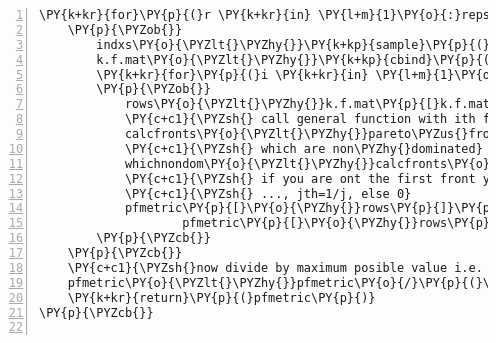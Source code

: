 \begin{Verbatim}[commandchars=\\\{\},codes={\catcode`\$=3\catcode`\^=7\catcode`\_=8},gobble=0,numbers=left,fontfamily=fvm,fontshape=n,fontsize=\footnotesize,tabsize=2]
	\PY{k+kr}{for}\PY{p}{(}r \PY{k+kr}{in} \PY{l+m}{1}\PY{o}{:}reps\PY{p}{)}
	\PY{p}{\PYZob{}}
		indxs\PY{o}{\PYZlt{}\PYZhy{}}\PY{k+kp}{sample}\PY{p}{(}\PY{l+m}{1}\PY{o}{:}n\PY{p}{)} \PY{c+c1}{\PYZsh{}fresh randomisation each repetition}
		k.f.mat\PY{o}{\PYZlt{}\PYZhy{}}\PY{k+kp}{cbind}\PY{p}{(}indxs\PY{p}{,}block.nos\PY{p}{)} \PY{c+c1}{\PYZsh{} create the fold \PYZsq{}blocks\PYZsq{} of data}
		\PY{k+kr}{for}\PY{p}{(}i \PY{k+kr}{in} \PY{l+m}{1}\PY{o}{:}nfolds\PY{p}{)}
		\PY{p}{\PYZob{}}
			rows\PY{o}{\PYZlt{}\PYZhy{}}k.f.mat\PY{p}{[}k.f.mat\PY{p}{[}\PY{p}{,}\PY{l+m}{2}\PY{p}{]}\PY{o}{==}i\PY{p}{,}\PY{l+m}{1}\PY{p}{]} \PY{c+c1}{\PYZsh{} find the ith fold to leave out}
			\PY{c+c1}{\PYZsh{} call general function with ith fold removed}
			calcfronts\PY{o}{\PYZlt{}\PYZhy{}}pareto\PYZus{}fronts\PY{p}{(}noFronts\PY{p}{,}objmatrix\PY{p}{[}\PY{o}{\PYZhy{}}rows\PY{p}{,}\PY{p}{]}\PY{p}{,}\PY{k+kp}{rep}\PY{p}{(}\PY{k+kc}{FALSE}\PY{p}{,}m\PY{p}{)}\PY{p}{)}
			\PY{c+c1}{\PYZsh{} which are non\PYZhy{}dominated}
			whichnondom\PY{o}{\PYZlt{}\PYZhy{}}calcfronts\PY{o}{\PYZgt{}}\PY{l+m}{0}
			\PY{c+c1}{\PYZsh{} if you are ont the first front you get 1, second=1/2, third=1/3,}
			\PY{c+c1}{\PYZsh{} ..., jth=1/j, else 0}
			pfmetric\PY{p}{[}\PY{o}{\PYZhy{}}rows\PY{p}{]}\PY{p}{[}whichnondom\PY{p}{]}\PY{o}{\PYZlt{}\PYZhy{}}
					pfmetric\PY{p}{[}\PY{o}{\PYZhy{}}rows\PY{p}{]}\PY{p}{[}whichnondom\PY{p}{]}\PY{l+m}{+1}\PY{o}{/}calcfronts\PY{p}{[}whichnondom\PY{p}{]}
		\PY{p}{\PYZcb{}}
	\PY{p}{\PYZcb{}}
	\PY{c+c1}{\PYZsh{}now divide by maximum posible value i.e. (nfolds\PYZhy{}1)*reps so output in [0,1]}
	pfmetric\PY{o}{\PYZlt{}\PYZhy{}}pfmetric\PY{o}{/}\PY{p}{(}\PY{p}{(}nfolds\PY{l+m}{\PYZhy{}1}\PY{p}{)}\PY{o}{*}reps\PY{p}{)} 
	\PY{k+kr}{return}\PY{p}{(}pfmetric\PY{p}{)}
\PY{p}{\PYZcb{}}


\end{Verbatim}
